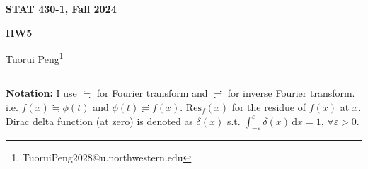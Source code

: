 \documentclass[11pt,a4paper]{article}
\numberwithin{equation}{section}%
\begin{document}
\begin{center}\thispagestyle{plain}

{\LARGE\textbf{STAT 430-1, Fall 2024}}

{\Large\textbf{HW5}}

Tuorui Peng\footnote{TuoruiPeng2028@u.northwestern.edu}
\end{center}

\thispagestyle{myheadings}
\pagestyle{myheadings}

\setcounter{tocdepth}{1}
\tableofcontents

  





\vspace{12pt}


\hrule
\vspace{12pt}

\textbf{Notation:} I use $ \fallingdotseq $ for Fourier transform and $ \risingdotseq $ for inverse Fourier transform. i.e. $ f(x)\fallingdotseq \phi (t) $ and $ \phi (t)\risingdotseq f(x) $. $ \mathrm{ Res }_f(x)  $ for the residue of $ f(x) $ at $ x $. Dirac delta function (at zero) is denoted as $ \delta (x) $ s.t. $ \int_{-\varepsilon }^\varepsilon \delta (x) \,\mathrm{d}x=1 ,\,\forall \varepsilon >0 $.
\end{document}
